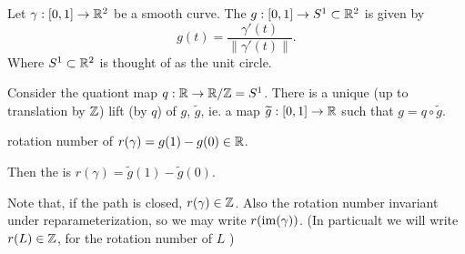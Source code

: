 

\begin{defn}
Let $\gamma: [0,1] \to \mathbb{R}^2$ be a smooth curve. The  $g: [0,1] \to S^1 \subset \mathbb{R}^2$ is given by
\[ g(t) = \frac{\gamma'(t)}{\|\gamma'(t)\|}. \] 
Where $S^1 \subset \mathbb{R}^2$ is thought of as the unit circle.

Consider the quationt map $q: \mathbb{R} \to \mathbb{R}/\mathbb{Z} = S^1$. There is a unique
(up to translation by $\mathbb{Z}$) lift (by $q$) of $g$, $\tilde{g}$, ie. a map
$\widetilde{g}:[0,1]\to \mathbb{R}$ such that $g = q \circ \tilde{g}$. 

rotation number of $r(\gamma) = g(1) - g(0) \in \mathbb{R}$.

Then the  is $r(\gamma) =
\tilde{g}(1) - \tilde{g}(0)$.
\end{defn}

Note that, if the path is closed, $r(\gamma) \in \mathbb{Z}$. Also the rotation number
invariant under reparameterization, so we may write $r(\operatorname{im}(\gamma))$.
(In particualt we will write $r(L) \in \mathbb{Z}$, for the rotation number of $L$ )

